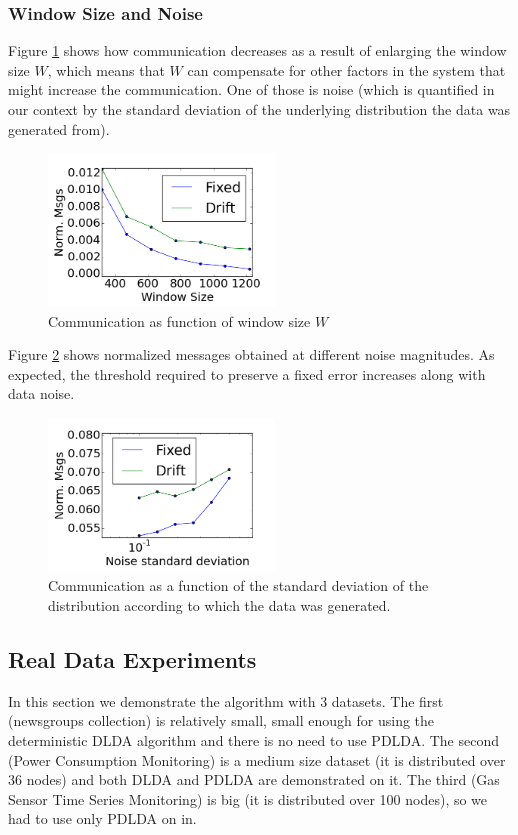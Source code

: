 \documentclass{sig-alternate-05-2015}
\begin{document}
\subsubsection{Window Size and Noise}
Figure \ref{WindowSize} shows how communication decreases as a result
of enlarging the window size $W$, which means that $W$ can compensate for other
factors in the system that might increase the communication. One of those is
noise (which is quantified in our context by the standard deviation of the
underlying distribution the data was generated from).
 \begin{figure}[h]
	\centering
	\includegraphics[width=60mm]{CommunicationOfFixedVsDrift/WindowSize.png}
	\caption{Communication as function of window size $W$}
	\label{WindowSize}
	\end{figure}
Figure \ref{Noise} shows normalized messages obtained at different
noise magnitudes. As expected, the threshold required to preserve a
fixed error increases along with data noise.
\begin{figure}[h]
	\centering
	\includegraphics[width=60mm]{CommunicationOfFixedVsDrift/Noise.png}
	\caption{Communication as a function of the standard deviation of the
	distribution according to which the data was generated.}
	\label{Noise}
	\end{figure}

\subsection{Real Data Experiments}
In this section we demonstrate the algorithm with 3 datasets. The first
(newsgroups collection) is relatively small, small enough for using
the deterministic DLDA algorithm and there is no need to use PDLDA.
The second (Power Consumption Monitoring) is a medium size dataset (it
is distributed over 36 nodes) and both DLDA and PDLDA are demonstrated on it.
The third (Gas Sensor Time Series Monitoring) is big (it is distributed over
100 nodes), so we had to use only PDLDA on in.
\end{document}

